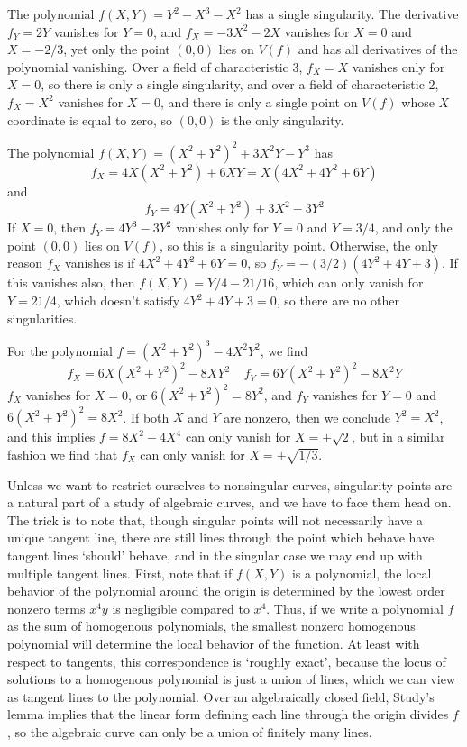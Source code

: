 \begin{example}
    The polynomial $f(X,Y) = Y^2 - X^3 - X^2$ has a single singularity. The derivative $f_Y = 2Y$ vanishes for $Y = 0$, and $f_X = -3X^2 - 2X$ vanishes for $X = 0$ and $X = -2/3$, yet only the point $(0,0)$ lies on $V(f)$ and has all derivatives of the polynomial vanishing. Over a field of characteristic 3, $f_X = X$ vanishes only for $X = 0$, so there is only a single singularity, and over a field of characteristic 2, $f_X = X^2$ vanishes for $X = 0$, and there is only a single point on $V(f)$ whose $X$ coordinate is equal to zero, so $(0,0)$ is the only singularity.
\end{example}

\begin{example}
    The polynomial $f(X,Y) = (X^2 + Y^2)^2 + 3X^2Y - Y^3$ has
    \[ f_X = 4X(X^2 + Y^2) + 6XY = X(4X^2 + 4Y^2 + 6Y) \]
    and
    \[ f_Y = 4Y(X^2 + Y^2) + 3X^2 - 3Y^2 \]
    If $X = 0$, then $f_Y = 4Y^3 - 3Y^2$ vanishes only for $Y = 0$ and $Y = 3/4$, and only the point $(0,0)$ lies on $V(f)$, so this is a singularity point. Otherwise, the only reason $f_X$ vanishes is if $4X^2 + 4Y^2 + 6Y = 0$, so $f_Y = -(3/2)(4Y^2 + 4Y + 3)$. If this vanishes also, then $f(X,Y) = Y/4 - 21/16$, which can only vanish for $Y = 21/4$, which doesn't satisfy $4Y^2 + 4Y + 3 = 0$, so there are no other singularities.
\end{example}

\begin{example}
    For the polynomial $f = (X^2 + Y^2)^3 - 4X^2Y^2$, we find
    \[ f_X = 6X(X^2 + Y^2)^2 - 8XY^2\ \ \ \ \ f_Y = 6Y(X^2 + Y^2)^2 - 8X^2Y \]
    $f_X$ vanishes for $X = 0$, or $6(X^2 + Y^2)^2 = 8Y^2$, and $f_Y$ vanishes for $Y = 0$ and $6(X^2 + Y^2)^2 = 8X^2$. If both $X$ and $Y$ are nonzero, then we conclude $Y^2 = X^2$, and this implies $f = 8X^2 - 4X^4$ can only vanish for $X = \pm \sqrt{2}$, but in a similar fashion we find that $f_X$ can only vanish for $X = \pm \sqrt{1/3}$.
\end{example}

Unless we want to restrict ourselves to nonsingular curves, singularity points are a natural part of a study of algebraic curves, and we have to face them head on. The trick is to note that, though singular points will not necessarily have a unique tangent line, there are still lines through the point which behave have tangent lines `should' behave, and in the singular case we may end up with multiple tangent lines. First, note that if $f(X,Y)$ is a polynomial, the local behavior of the polynomial around the origin is determined by the lowest order nonzero terms $x^4y$ is negligible compared to $x^4$. Thus, if we write a polynomial $f$ as the sum of homogenous polynomials, the smallest nonzero homogenous polynomial will determine the local behavior of the function. At least with respect to tangents, this correspondence is `roughly exact', because the locus of solutions to a homogenous polynomial is just a union of lines, which we can view as tangent lines to the polynomial. Over an algebraically closed field, Study's lemma implies that the linear form defining each line through the origin divides $f$, so the algebraic curve can only be a union of finitely many lines.


